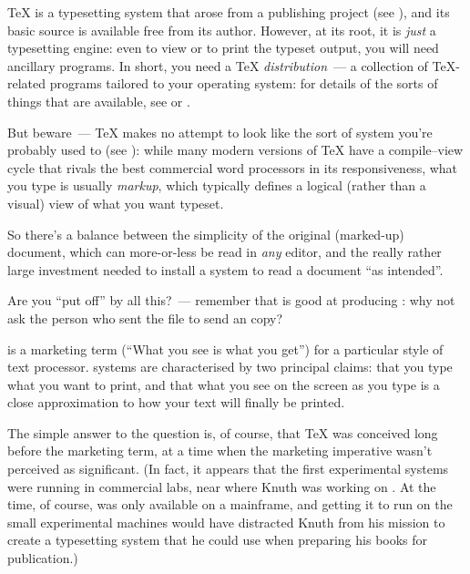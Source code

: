 \TeX{} is a typesetting system that arose from a publishing project (see
),
and its basic source is available free from its author.  However, at
its root, it is \emph{just} a typesetting engine: even to view or to
print the typeset output, you will need ancillary programs.  In short,
you need a \TeX{} \emph{distribution}~--- a collection of
\TeX{}-related programs tailored to your operating system: for details
of the sorts of things that are available, see
or
.

But beware~--- \TeX{} makes no attempt to look like the sort of
\WYSIWYG{} system you're probably used to (see
):
while many modern versions of \TeX{} have a compile--view cycle that
rivals the best commercial word processors in its responsiveness, what
you type is usually \emph{markup}, which typically defines a logical
(rather than a visual) view of what you want typeset.

So there's a balance between the simplicity of the original
(marked-up) document, which can more-or-less be read in \emph{any}
editor, and the really rather large investment needed to install a
system to read a document ``as intended''.

Are you ``put off'' by all this?~--- remember that \tex{} is good at
producing : why not ask the person who sent the \tex{} file
to send an  copy?


\WYSIWYG{} is a marketing term (``What you see is what you get'') for
a particular style of text processor.  \WYSIWYG{} systems are
characterised by two principal claims: that you type what you want to
print, and that what you see on the screen as you type is a close
approximation to how your text will finally be printed.

The simple answer to the question is, of course, that \TeX{} was
conceived long before the marketing term, at a time when the marketing
imperative wasn't perceived as significant.  (In fact, it appears that
the first experimental \WYSIWYG{} systems were running in commercial
labs, near where Knuth was working on \tex{}.  At the time, of course,
\tex{} was only available on a mainframe, and getting it to run on the
small experimental machines would have distracted Knuth from his
mission to create a typesetting system that he could use when
preparing his books for publication.)

